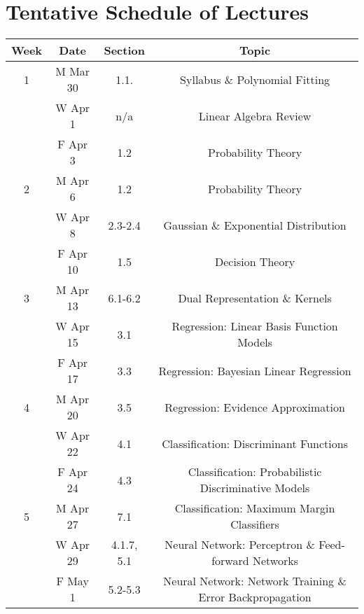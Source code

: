 \documentclass[11pt]{article}
\begin{document}
\section*{Tentative Schedule of Lectures}
\begin{tabular*}{\textwidth}{cccc}

Week & Date & Section & Topic \\
\hline
1 & M Mar 30 &   1.1.  & Syllabus \& Polynomial Fitting \\
  & W Apr 1  &   n/a   & Linear Algebra Review \\
  & F Apr 3  &   1.2   & Probability Theory \\
 
\hline

2 & M Apr 6  &   1.2   & Probability Theory \\
  & W Apr 8  & 2.3-2.4 & Gaussian \& Exponential Distribution \\
  & F Apr 10 &   1.5   & Decision Theory \\
 
\hline

3 & M Apr 13 & 6.1-6.2 & Dual Representation \& Kernels \\
  & W Apr 15 &   3.1   & Regression: Linear Basis Function Models \\
  & F Apr 17 &   3.3   & Regression: Bayesian Linear Regression \\
 
\hline

4 & M Apr 20 &   3.5   & Regression: Evidence Approximation \\ %
  & W Apr 22 &   4.1   & Classification: Discriminant Functions \\
  & F Apr 24 &   4.3   & Classification: Probabilistic Discriminative Models \\
 
\hline

5 & M Apr 27 &   7.1   & Classification: Maximum Margin Classifiers \\
  & W Apr 29 & 4.1.7, 5.1 & Neural Network: Perceptron \& Feed-forward Networks \\
  & F May 1  & 5.2-5.3 & Neural Network: Network Training \& Error Backpropagation\\
 
\hline


\end{tabular*}
\end{document}
